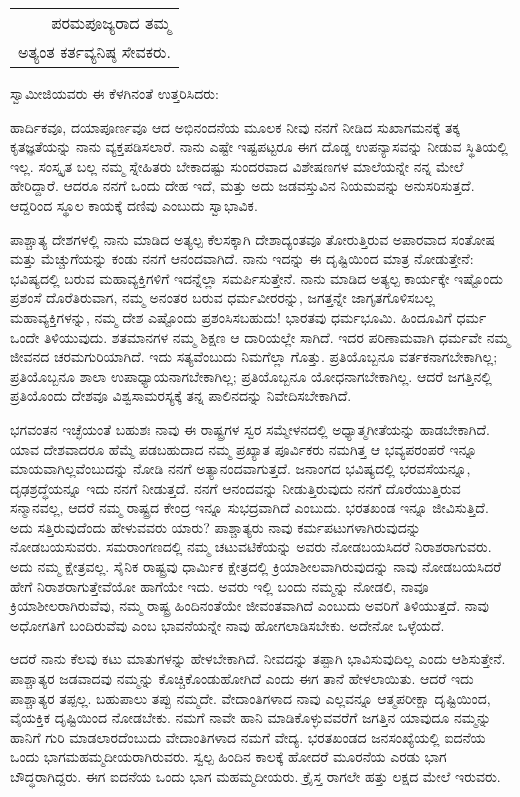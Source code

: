 \begin{longtable}[r]{@{}r@{}}
ಪರಮಪೂಜ್ಯರಾದ ತಮ್ಮ \\
ಅತ್ಯಂತ ಕರ್ತವ್ಯನಿಷ್ಠ ಸೇವಕರು. \\
\end{longtable}

ಸ್ವಾಮೀಜಿಯವರು ಈ ಕೆಳಗಿನಂತೆ ಉತ್ತರಿಸಿದರು:

ಹಾರ್ದಿಕವೂ, ದಯಾಪೂರ್ಣವೂ ಆದ ಅಭಿನಂದನೆಯ ಮೂಲಕ ನೀವು ನನಗೆ ನೀಡಿದ ಸುಖಾಗಮನಕ್ಕೆ ತಕ್ಕ ಕೃತಜ್ಞತೆಯನ್ನು ನಾನು ವ್ಯಕ್ತಪಡಿಸಲಾರೆ. ನಾನು ಎಷ್ಟೇ ಇಷ್ಟಪಟ್ಟರೂ ಈಗ ದೊಡ್ಡ ಉಪನ್ಯಾಸವನ್ನು ನೀಡುವ ಸ್ಥಿತಿಯಲ್ಲಿ ಇಲ್ಲ. ಸಂಸ್ಕೃತ ಬಲ್ಲ ನಮ್ಮ ಸ್ನೇಹಿತರು ಬೇಕಾದಷ್ಟು ಸುಂದರವಾದ ವಿಶೇಷಣಗಳ ಮಾಲೆಯನ್ನೇ ನನ್ನ ಮೇಲೆ ಹೇರಿದ್ದಾರೆ. ಆದರೂ ನನಗೆ ಒಂದು ದೇಹ ಇದೆ, ಮತ್ತು ಅದು ಜಡವಸ್ತುವಿನ ನಿಯಮವನ್ನು ಅನುಸರಿಸುತ್ತದೆ. ಆದ್ದರಿಂದ ಸ್ಥೂಲ ಕಾಯಕ್ಕೆ ದಣಿವು ಎಂಬುದು ಸ್ವಾಭಾವಿಕ.

ಪಾಶ್ಚಾತ್ಯ ದೇಶಗಳಲ್ಲಿ ನಾನು ಮಾಡಿದ ಅತ್ಯಲ್ಪ ಕೆಲಸಕ್ಕಾಗಿ ದೇಶಾದ್ಯಂತವೂ ತೋರುತ್ತಿರುವ ಅಪಾರವಾದ ಸಂತೋಷ ಮತ್ತು ಮೆಚ್ಚುಗೆಯನ್ನು ಕಂಡು ನನಗೆ ಆನಂದವಾಗಿದೆ. ನಾನು ಇದನ್ನು ಈ ದೃಷ್ಟಿಯಿಂದ ಮಾತ್ರ ನೋಡುತ್ತೇನೆ: ಭವಿಷ್ಯದಲ್ಲಿ ಬರುವ ಮಹಾವ್ಯಕ್ತಿಗಳಿಗೆ ಇದನ್ನೆಲ್ಲಾ ಸಮರ್ಪಿಸುತ್ತೇನೆ. ನಾನು ಮಾಡಿದ ಅತ್ಯಲ್ಪ ಕಾರ್ಯಕ್ಕೇ ಇಷ್ಟೊಂದು ಪ್ರಶಂಸೆ ದೊರೆತಿರುವಾಗ, ನಮ್ಮ ಅನಂತರ ಬರುವ ಧರ್ಮವೀರರನ್ನು, ಜಗತ್ತನ್ನೇ ಜಾಗೃತಗೊಳಿಸಬಲ್ಲ ಮಹಾವ್ಯಕ್ತಿಗಳನ್ನು, ನಮ್ಮ ದೇಶ ಎಷ್ಟೊಂದು ಪ್ರಶಂಸಿಸಬಹುದು! ಭಾರತವು ಧರ್ಮಭೂಮಿ. ಹಿಂದೂವಿಗೆ ಧರ್ಮ ಒಂದೇ ತಿಳಿಯುವುದು. ಶತಮಾನಗಳ ನಮ್ಮ ಶಿಕ್ಷಣ ಆ ದಾರಿಯಲ್ಲೇ ಸಾಗಿದೆ. ಇದರ ಪರಿಣಾಮವಾಗಿ ಧರ್ಮವೇ ನಮ್ಮ ಜೀವನದ ಚರಮಗುರಿಯಾಗಿದೆ. ಇದು ಸತ್ಯವೆಂಬುದು ನಿಮಗೆಲ್ಲಾ ಗೊತ್ತು. ಪ್ರತಿಯೊಬ್ಬನೂ ವರ್ತಕನಾಗಬೇಕಾಗಿಲ್ಲ; ಪ್ರತಿಯೊಬ್ಬನೂ ಶಾಲಾ ಉಪಾಧ್ಯಾಯನಾಗಬೇಕಾಗಿಲ್ಲ; ಪ್ರತಿಯೊಬ್ಬನೂ ಯೋಧನಾಗಬೇಕಾಗಿಲ್ಲ. ಆದರೆ ಜಗತ್ತಿನಲ್ಲಿ ಪ್ರತಿಯೊಂದು ದೇಶವೂ ವಿಶ್ವಸಾಮರಸ್ಯಕ್ಕೆ ತನ್ನ ಪಾಲಿನದನ್ನು ನಿವೇದಿಸಬೇಕಾಗಿದೆ.

ಭಗವಂತನ ಇಚ್ಛೆಯಂತೆ ಬಹುಶಃ ನಾವು ಈ ರಾಷ್ಟ್ರಗಳ ಸ್ವರ ಸಮ್ಮೇಳನದಲ್ಲಿ ಅಧ್ಯಾತ್ಮಗೀತೆಯನ್ನು ಹಾಡಬೇಕಾಗಿದೆ. ಯಾವ ದೇಶವಾದರೂ ಹೆಮ್ಮೆ ಪಡಬಹುದಾದ ನಮ್ಮ ಪ್ರಖ್ಯಾತ ಪೂರ್ವಿಕರು ನಮಗಿತ್ತ ಆ ಭವ್ಯಪರಂಪರೆ ಇನ್ನೂ ಮಾಯವಾಗಿಲ್ಲವೆಂಬುದನ್ನು ನೋಡಿ ನನಗೆ ಅತ್ಯಾನಂದವಾಗುತ್ತದೆ. ಜನಾಂಗದ ಭವಿಷ್ಯದಲ್ಲಿ ಭರವಸೆಯನ್ನೂ, ದೃಢಶ್ರದ್ಧೆಯನ್ನೂ ಇದು ನನಗೆ ನೀಡುತ್ತದೆ. ನನಗೆ ಆನಂದವನ್ನು ನೀಡುತ್ತಿರುವುದು ನನಗೆ ದೊರೆಯುತ್ತಿರುವ ಸನ್ಮಾನವಲ್ಲ, ಆದರೆ ನಮ್ಮ ರಾಷ್ಟ್ರದ ಕೇಂದ್ರ ಇನ್ನೂ ಸುಭದ್ರವಾಗಿದೆ ಎಂಬುದು. ಭರತಖಂಡ ಇನ್ನೂ ಜೀವಿಸುತ್ತಿದೆ. ಅದು ಸತ್ತಿರುವುದೆಂದು ಹೇಳುವವರು ಯಾರು? ಪಾಶ್ಚಾತ್ಯರು ನಾವು ಕರ್ಮಪಟುಗಳಾಗಿರುವುದನ್ನು ನೋಡಬಯಸುವರು. ಸಮರಾಂಗಣದಲ್ಲಿ ನಮ್ಮ ಚಟುವಟಿಕೆಯನ್ನು ಅವರು ನೋಡಬಯಸಿದರೆ ನಿರಾಶರಾಗುವರು. ಅದು ನಮ್ಮ ಕ್ಷೇತ್ರವಲ್ಲ. ಸೈನಿಕ ರಾಷ್ಟ್ರವು ಧಾರ್ಮಿಕ ಕ್ಷೇತ್ರದಲ್ಲಿ ಕ್ರಿಯಾಶೀಲವಾಗಿರುವುದನ್ನು ನಾವು ನೋಡಬಯಸಿದರೆ ಹೇಗೆ ನಿರಾಶರಾಗುತ್ತೇವೆಯೋ ಹಾಗೆಯೇ ಇದು. ಅವರು ಇಲ್ಲಿ ಬಂದು ನಮ್ಮನ್ನು ನೋಡಲಿ, ನಾವೂ ಕ್ರಿಯಾಶೀಲರಾಗಿರುವೆವು, ನಮ್ಮ ರಾಷ್ಟ್ರ ಹಿಂದಿನಂತೆಯೇ ಜೀವಂತವಾಗಿದೆ ಎಂಬುದು ಅವರಿಗೆ ತಿಳಿಯುತ್ತದೆ. ನಾವು ಅಧೋಗತಿಗೆ ಬಂದಿರುವೆವು ಎಂಬ ಭಾವನೆಯನ್ನೇ ನಾವು ಹೋಗಲಾಡಿಸಬೇಕು. ಅದೇನೋ ಒಳ್ಳೆಯದೆ.

ಆದರೆ ನಾನು ಕೆಲವು ಕಟು ಮಾತುಗಳನ್ನು ಹೇಳಬೇಕಾಗಿದೆ. ನೀವದನ್ನು ತಪ್ಪಾಗಿ ಭಾವಿಸುವುದಿಲ್ಲ ಎಂದು ಆಶಿಸುತ್ತೇನೆ. ಪಾಶ್ಚಾತ್ಯರ ಜಡವಾದವು ನಮ್ಮನ್ನು ಕೊಚ್ಚಿಕೊಂಡುಹೋಗಿದೆ ಎಂದು ಈಗ ತಾನೆ ಹೇಳಲಾಯಿತು. ಆದರೆ ಇದು ಪಾಶ್ಚಾತ್ಯರ ತಪ್ಪಲ್ಲ. ಬಹುಪಾಲು ತಪ್ಪು ನಮ್ಮದೇ. ವೇದಾಂತಿಗಳಾದ ನಾವು ಎಲ್ಲವನ್ನೂ ಆತ್ಮಪರೀಕ್ಷಾ ದೃಷ್ಟಿಯಿಂದ, ವೈಯಕ್ತಿಕ ದೃಷ್ಟಿಯಿಂದ ನೋಡಬೇಕು. ನಮಗೆ ನಾವೇ ಹಾನಿ ಮಾಡಿಕೊಳ್ಳುವವರೆಗೆ ಜಗತ್ತಿನ ಯಾವುದೂ ನಮ್ಮನ್ನು ಹಾನಿಗೆ ಗುರಿ ಮಾಡಲಾರದೆಂಬುದು ವೇದಾಂತಿಗಳಾದ ನಮಗೆ ವೇದ್ಯ. ಭರತಖಂಡದ ಜನಸಂಖ್ಯೆಯಲ್ಲಿ ಐದನೆಯ ಒಂದು ಭಾಗ\break ಮಹಮ್ಮದೀಯರಾಗಿರುವರು. ಸ್ವಲ್ಪ ಹಿಂದಿನ ಕಾಲಕ್ಕೆ ಹೋದರೆ ಮೂರನೆಯ ಎರಡು ಭಾಗ ಬೌದ್ಧರಾಗಿದ್ದರು. ಈಗ ಐದನೆಯ ಒಂದು ಭಾಗ ಮಹಮ್ಮದೀಯರು. ಕ್ರೈಸ್ತ ರಾಗಲೇ ಹತ್ತು ಲಕ್ಷದ ಮೇಲೆ ಇರುವರು.

